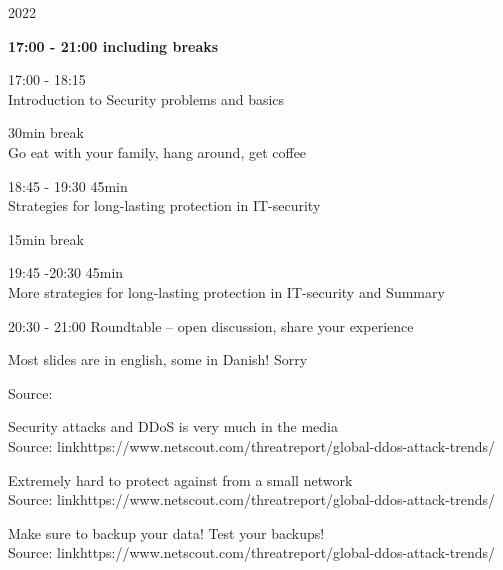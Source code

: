 \documentclass[Screen16to9,17pt]{foils}
\begin{document}
{2022}



{\bf 17:00 - 21:00 including breaks}

\begin{list2}
\item 17:00 - 18:15\\
Introduction to Security problems and basics
\item 30min break\\
Go eat with your family, hang around, get coffee

\item 18:45 - 19:30 45min\\ Strategies for long-lasting protection in IT-security

\item 15min break\\

\item 19:45 -20:30 45min \\
More strategies for long-lasting protection in IT-security and Summary
\item 20:30 - 21:00 Roundtable -- open discussion, share your experience
\end{list2}

Most slides are in english, some in Danish! Sorry



Source: 




Security attacks and DDoS is very much in the media\\
Source: link{https://www.netscout.com/threatreport/global-ddos-attack-trends/}



Extremely hard to protect against from a small network\\
Source: link{https://www.netscout.com/threatreport/global-ddos-attack-trends/}




Make sure to backup your data! Test your backups!\\
Source: link{https://www.netscout.com/threatreport/global-ddos-attack-trends/}
\end{document}
